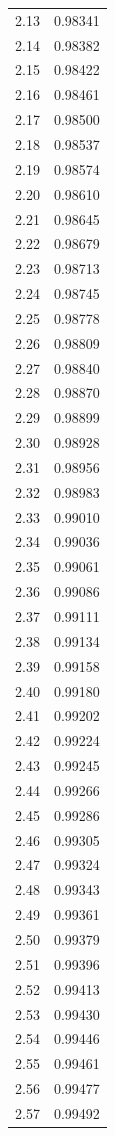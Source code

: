 \documentclass[
  letterpaper,
  DIV=11,
  numbers=noendperiod]{scrartcl}
\begin{document}
\begin{longtable}[]{@{}cc@{}}
2.13 & 0.98341 \\
2.14 & 0.98382 \\
2.15 & 0.98422 \\
2.16 & 0.98461 \\
2.17 & 0.98500 \\
2.18 & 0.98537 \\
2.19 & 0.98574 \\
2.20 & 0.98610 \\
2.21 & 0.98645 \\
2.22 & 0.98679 \\
2.23 & 0.98713 \\
2.24 & 0.98745 \\
2.25 & 0.98778 \\
2.26 & 0.98809 \\
2.27 & 0.98840 \\
2.28 & 0.98870 \\
2.29 & 0.98899 \\
2.30 & 0.98928 \\
2.31 & 0.98956 \\
2.32 & 0.98983 \\
2.33 & 0.99010 \\
2.34 & 0.99036 \\
2.35 & 0.99061 \\
2.36 & 0.99086 \\
2.37 & 0.99111 \\
2.38 & 0.99134 \\
2.39 & 0.99158 \\
2.40 & 0.99180 \\
2.41 & 0.99202 \\
2.42 & 0.99224 \\
2.43 & 0.99245 \\
2.44 & 0.99266 \\
2.45 & 0.99286 \\
2.46 & 0.99305 \\
2.47 & 0.99324 \\
2.48 & 0.99343 \\
2.49 & 0.99361 \\
2.50 & 0.99379 \\
2.51 & 0.99396 \\
2.52 & 0.99413 \\
2.53 & 0.99430 \\
2.54 & 0.99446 \\
2.55 & 0.99461 \\
2.56 & 0.99477 \\
2.57 & 0.99492 \\

\end{longtable}
\end{document}
